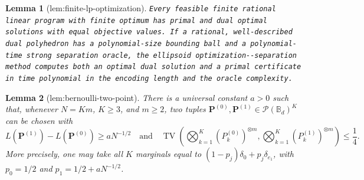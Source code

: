 \documentclass{article}
\newtheorem{lemma}{Lemma}
\begin{document}
\begin{lemma}[lem:finite-lp-optimization]\label{lem:finite-lp-optimization}
\texttt{Every feasible finite rational linear program with finite optimum has primal and dual optimal solutions with equal objective values. If a rational,\allowbreak{} well-\allowbreak{}described dual polyhedron has a polynomial-\allowbreak{}size bounding ball and a polynomial-\allowbreak{}time strong separation oracle,\allowbreak{} the ellipsoid optimization-\allowbreak{}-\allowbreak{}separation method computes both an optimal dual solution and a primal certificate in time polynomial in the encoding length and the oracle complexity.}
\end{lemma}

\begin{lemma}[lem:bernoulli-two-point]\label{lem:bernoulli-two-point}
There is a universal constant \(a>0\) such that, whenever \(N=Km\), \(K\ge3\), and \(m\ge2\), two tuples \(\mathbf P^{(0)},\mathbf P^{(1)}\in\mathcal P(\mathbb B_d)^K\) can be chosen with
\[
L(\mathbf P^{(1)})-L(\mathbf P^{(0)})\ge aN^{-1/2}
\quad\text{and}\quad
\operatorname{TV}\!\left(\bigotimes_{k=1}^K(P_k^{(0)})^{\otimes m},
\bigotimes_{k=1}^K(P_k^{(1)})^{\otimes m}\right)\le\frac14.
\]
More precisely, one may take all \(K\) marginals equal to \((1-p_j)\delta_0+p_j\delta_{e_1}\), with \(p_0=1/2\) and \(p_1=1/2+aN^{-1/2}\).
\end{lemma}
\end{document}
